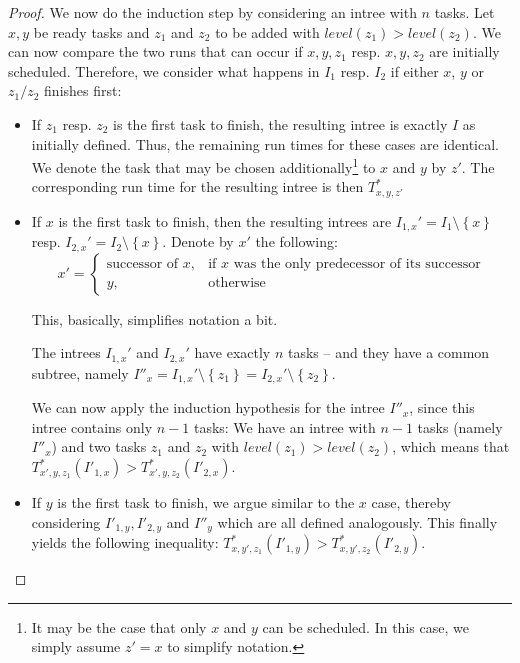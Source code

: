 \begin{proof}
  We now do the induction step by considering an intree with $n$ tasks. Let $x,y$ be ready tasks and $z_1$ and $z_2$ to be added with $level(z_1) > level(z_2)$. We can now compare the two runs that can occur if $x,y,z_1$ resp. $x,y,z_2$ are initially scheduled. 
  Therefore, we consider what happens in $I_1$ resp. $I_2$ if either $x$, $y$ or $z_1/z_2$ finishes first:

  \begin{itemize}
  \item If $z_1$ resp. $z_2$ is the first task to finish, the resulting intree is exactly $I$ as initially defined. Thus, the remaining run times for these cases are identical. We denote the task that may be chosen additionally\footnote{It may be the case that only $x$ and $y$ can be scheduled. In this case, we simply assume $z'=x$ to simplify notation.} to $x$ and $y$ by $z'$. The corresponding run time for the resulting intree is then $T^*_{x,y,z'}$
  \item If $x$ is the first task to finish, then the resulting intrees are $I_{1,x}'=I_1\setminus\left\{ x \right\}$ resp. $I_{2,x}'=I_2\setminus\left\{ x \right\}$. Denote by $x'$ the following:
    \begin{equation*}
      x' =
      \begin{cases}
        \text{successor of } x, & \text{if $x$ was the only predecessor of its successor} \\
        y, & \text{otherwise}
      \end{cases}
    \end{equation*}
    
    This, basically, simplifies notation a bit.
    
    The intrees $I_{1,x}'$ and $I_{2,x}'$ have exactly $n$ tasks -- and they have a common subtree, namely $I''_x=I_{1,x}'\setminus\left\{ z_1 \right\}=I_{2,x}'\setminus\left\{ z_2 \right\}$.
    
    We can now apply the induction hypothesis for the intree $I''_x$, since this intree contains only $n-1$ tasks: We have an intree with $n-1$ tasks (namely $I''_x$) and two tasks $z_1$ and $z_2$ with $level(z_1)>level(z_2)$, which means that $T^*_{x',y,z_1}(I'_{1,x})>T^*_{x',y,z_2}(I'_{2,x})$.
  \item If $y$ is the first task to finish, we argue similar to the $x$ case, thereby considering $I'_{1,y},I'_{2,y}$ and $I''_y$ which are all defined analogously. This finally yields the following inequality: $T^*_{x,y',z_1}(I'_{1,y}) > T^*_{x,y',z_2}(I'_{2,y})$.
  \end{itemize}


\end{proof}
